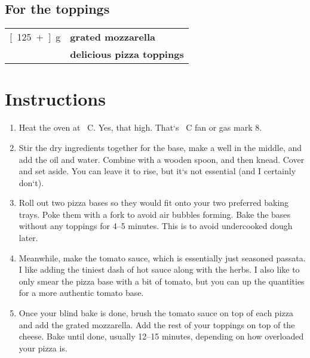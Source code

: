 \documentclass[main.tex]{subfiles}
\begin{document}
\subsection{For the toppings}
\vspace*{-\baselineskip}
\begin{table}[ht]
	\begin{tabularx}{\textwidth}{>{\hsize=0.333\hsize}X>{\bf\hsize=1\hsize}X}
	\unit[125+]{g} & grated mozzarella \\
	\unit[]{} & delicious pizza toppings \\
	\end{tabularx}
\end{table}

\section{Instructions}

\begin{enumerate}
    \item Heat the oven at \unit[240]{\textdegree C}. Yes, that high. That`s \unit[220]{\textdegree C} fan or gas mark 8.
    \item Stir the dry ingredients together for the base, make a well in the middle, and add the oil and water. Combine with a wooden spoon, and then knead. Cover and set aside. You can leave it to rise, but it`s not essential (and I certainly don`t).
    \item Roll out two pizza bases so they would fit onto your two preferred baking trays. Poke them with a fork to avoid air bubbles forming. Bake the bases without any toppings for 4--5 minutes. This is to avoid undercooked dough later.
    \item Meanwhile, make the tomato sauce, which is essentially just seasoned passata. I like adding the tiniest dash of hot sauce along with the herbs. I also like to only smear the pizza base with a bit of tomato, but you can up the quantities for a more authentic tomato base.
    \item Once your blind bake is done, brush the tomato sauce on top of each pizza and add the grated mozzarella. Add the rest of your toppings on top of the cheese. Bake until done, usually 12--15 minutes, depending on how overloaded your pizza is.
	
\end{enumerate}

\end{document}
